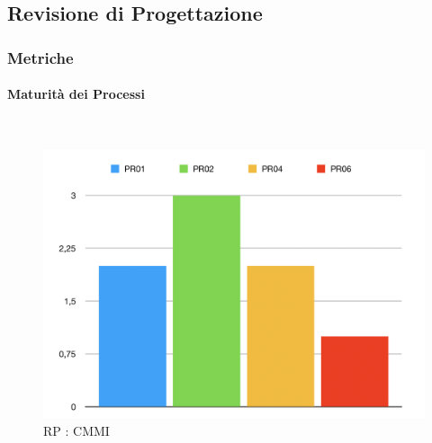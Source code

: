 \newpage

\subsection{Revisione di Progettazione}\label{RevisioneP}
\subsubsection{Metriche}

\paragraph{Maturità dei Processi} \-\\

\begin{figure}[H]
	\begin{center}
		\includegraphics[scale=0.4]{./images/grafici_RP/CMMI.png} 
	\end{center}
	\caption{RP : CMMI}
\end{figure}

\pagebreak

